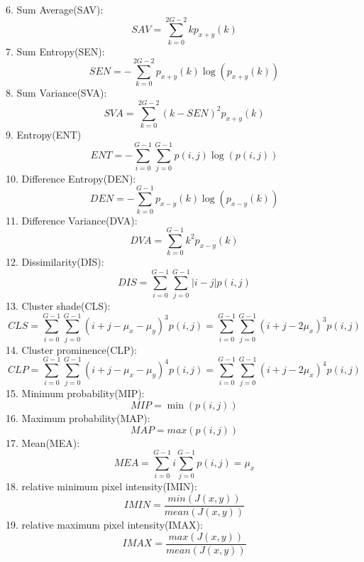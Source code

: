 6. Sum Average(SAV):
\begin{equation}
SAV = \sum_{k=0}^{2G-2}kp_{x+y}(k)
\end{equation}
7. Sum Entropy(SEN):
\begin{equation}
SEN = -\sum_{k=0}^{2G-2}p_{x+y}(k)\log(p_{x+y}(k))
\end{equation}
8. Sum Variance(SVA):
\begin{equation}
SVA = \sum_{k=0}^{2G-2}(k-SEN)^2p_{x+y}(k)
\end{equation}
9. Entropy(ENT)
\begin{equation}
ENT = - \sum_{i=0}^{G-1}\sum_{j=0}^{G-1}p(i,j)\log(p(i,j))
\end{equation}
10. Difference Entropy(DEN):
\begin{equation}
DEN = -\sum_{k=0}^{G-1}p_{x-y}(k)\log(p_{x-y}(k))
\end{equation}
11. Difference Variance(DVA):
\begin{equation}
DVA = \sum_{k=0}^{G-1}k^2p_{x-y}(k)
\end{equation}
12. Dissimilarity(DIS):
\begin{equation}
DIS = \sum_{i=0}^{G-1}\sum_{j=0}^{G-1}|i-j|p(i,j)
\end{equation}
13. Cluster shade(CLS):
\begin{equation}
CLS = \sum_{i=0}^{G-1}\sum_{j=0}^{G-1}(i+j-\mu_x-\mu_y)^3p(i,j) = \sum_{i=0}^{G-1}\sum_{j=0}^{G-1}(i+j-2\mu_x)^3p(i,j)
\end{equation}
14. Cluster prominence(CLP):
\begin{equation}
CLP=\sum_{i=0}^{G-1}\sum_{j=0}^{G-1}(i+j-\mu_x-\mu_y)^4p(i,j) = \sum_{i=0}^{G-1}\sum_{j=0}^{G-1}(i+j-2\mu_x)^4p(i,j)
\end{equation}
15. Minimum probability(MIP):
\begin{equation}
MIP = \min(p(i,j))
\end{equation}
16. Maximum probability(MAP):
\begin{equation}
MAP=max(p(i,j))
\end{equation}
17. Mean(MEA):
\begin{equation}
MEA = \sum_{i=0}^{G-1}i\sum_{j=0}^{G-1}p(i,j) = \mu_x
\end{equation}
18. relative minimum pixel intensity(IMIN):
\begin{equation}
IMIN = \frac{min(J(x,y))}{mean(J(x,y))}
\end{equation}
19. relative maximum pixel intensity(IMAX):
\begin{equation}
IMAX = \frac{max(J(x,y))}{mean(J(x,y))}
\end{equation}
